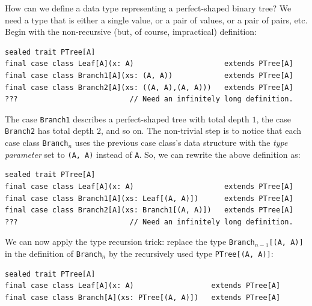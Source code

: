 How can we define a data type representing a perfect-shaped binary
tree? We need a type that is either a single value, or a pair of values,
or a pair of pairs, etc. Begin with the non-recursive (but, of course,
impractical) definition:
\begin{lstlisting}
sealed trait PTree[A]
final case class Leaf[A](x: A)                     extends PTree[A]
final case class Branch1[A](xs: (A, A))            extends PTree[A]
final case class Branch2[A](xs: ((A, A),(A, A)))   extends PTree[A]
???                          // Need an infinitely long definition.
\end{lstlisting}
The case \lstinline!Branch1! describes a perfect-shaped tree with
total depth $1$, the case \lstinline!Branch2! has total depth $2$,
and so on. The non-trivial step is to notice that each case class
\lstinline!Branch!$_{n}$ uses the previous case class\textsf{'}s data structure
with the \emph{type parameter} set to \lstinline!(A, A)! instead
of \lstinline!A!. So, we can rewrite the above definition as:
\begin{lstlisting}
sealed trait PTree[A]
final case class Leaf[A](x: A)                     extends PTree[A]
final case class Branch1[A](xs: Leaf[(A, A)])      extends PTree[A]
final case class Branch2[A](xs: Branch1[(A, A)])   extends PTree[A]
???                          // Need an infinitely long definition.
\end{lstlisting}
We can now apply the type recursion trick: replace the type \lstinline!Branch!$_{n-1}$\lstinline![(A, A)]!
in the definition of \lstinline!Branch!$_{n}$ by the recursively
used type \lstinline!PTree[(A, A)]!:
\begin{lstlisting}
sealed trait PTree[A]
final case class Leaf[A](x: A)                  extends PTree[A]
final case class Branch[A](xs: PTree[(A, A)])   extends PTree[A]
\end{lstlisting}

